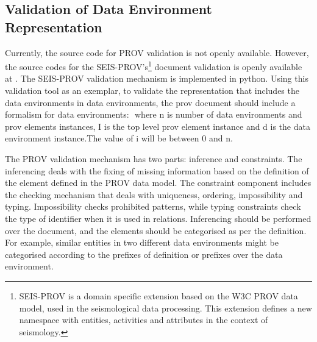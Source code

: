 \subsection{Validation of Data Environment Representation}
Currently, the source code for PROV validation is not openly available. However, the source codes for the SEIS-PROV’s\footnote{SEIS-PROV is a domain specific extension based on the W3C PROV data model, used in the seismological data processing. This extension defines a new namespace with entities, activities and attributes in the context of seismology.}   document validation is openly available at \cite{SEISPROV}. The SEIS-PROV validation mechanism is implemented in python. Using this validation tool as an exemplar, to validate the representation that includes the data environments in data environments, the prov document should include a formalism for data environments:
\begin{math}
[d_i=I_i \cup d_1,....,[d_n=I_n \cup  d_{n-1}] 
\end{math}
where  n is number of data environments and prov elements instances, I is the top level prov element instance and d is the data environment instance.The value of i will be between 0 and n. 

The PROV validation mechanism has two parts: inference and constraints. The inferencing  deals with the fixing of missing information based on the definition of the element defined in the PROV data model. The constraint component includes the checking mechanism that deals with uniqueness, ordering, impossibility and typing. Impossibility checks prohibited patterns, while typing constraints check the type of identifier when it is used in relations.    
Inferencing should be performed over the document, and the elements should be categorised as per the definition. 
For example, similar entities in two different data environments might be categorised according to the prefixes of definition or prefixes over the data environment.
     
